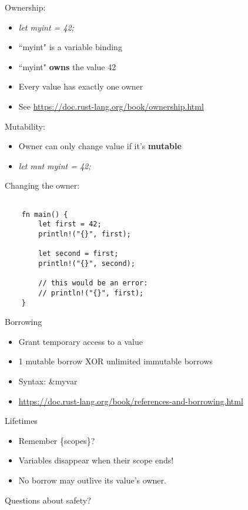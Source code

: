 \documentclass[100pt]{beamer}
\begin{document}
\begin{frame}
    Ownership:
    \begin{itemize}
        \item \textit{let myint = 42;}
        \item ``myint" is a variable binding
        \item ``myint" \textbf{owns} the value 42
        \item Every value has exactly one owner
        \item See \url{https://doc.rust-lang.org/book/ownership.html}
    \end{itemize}
\end{frame}

\begin{frame}
    Mutability:
    \begin{itemize}
        \item Owner can only change value if it's \textbf{mutable}
        \item \textit{let mut myint = 42;}
    \end{itemize}
\end{frame}

\begin{frame}[fragile]
    Changing the owner:
\begin{verbatim}

    fn main() {
        let first = 42;
        println!("{}", first);

        let second = first;
        println!("{}", second);

        // this would be an error:
        // println!("{}", first);
    }

\end{verbatim}

\end{frame}

\begin{frame}
    Borrowing
    \begin{itemize}
        \item Grant temporary access to a value
        \item 1 mutable borrow XOR unlimited immutable borrows
        \item Syntax: \&myvar
        \item \url{https://doc.rust-lang.org/book/references-and-borrowing.html}
    \end{itemize}
\end{frame}

\begin{frame}
    Lifetimes
    \begin{itemize}
        \item Remember \{scopes\}?
        \item Variables disappear when their scope ends!
        \item No borrow may outlive its value's owner.
    \end{itemize}
\end{frame}
\begin{frame}
    Questions about safety?
\end{frame}
\end{document}
